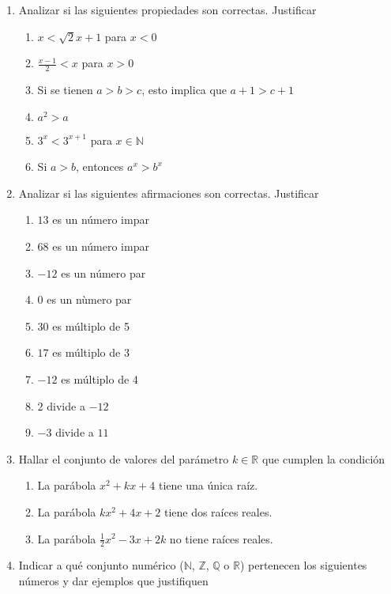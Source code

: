 \documentclass[a4paper]{article}
\newcommand{\exercise}{\item}
\begin{document}
\begin{enumerate}
	\exercise Analizar si las siguientes propiedades son correctas. Justificar
	\begin{multicols}{2}
	\begin{enumerate} [label=(\alph*)]
		\item $x < \sqrt{2} x +1$ para $x<0$
		\item $\displaystyle\frac{x-1}{2} < x$ para $x>0$
		\item Si se tienen $a>b>c$, esto implica que $a+1>c+1$
		\item $a^2 > a$
		\item $3^{x} < 3^{x+1}$ para $x \in \mathbb{N}$
		\item Si $a>b$, entonces $a^x > b^x$
	\end{enumerate}
	\end{multicols}
	\exercise Analizar si las siguientes afirmaciones son correctas. Justificar
	\begin{multicols}{2}
	\begin{enumerate} [label=(\alph*)]
		\item $13$ es un número impar
		\item $68$ es un número impar
		\item $-12$ es un número par
		\item $0$ es un nùmero par
		\item $30$ es múltiplo de 5
		\item $17$ es múltiplo de 3
		\item $-12$ es múltiplo de 4
		\item $2$ divide a $-12$
		\item $-3$ divide a $11$
	\end{enumerate}
	\end{multicols}
	\exercise Hallar el conjunto de valores del parámetro $k \in \mathbb{R}$ que cumplen la condición
	\begin{enumerate} [label=(\alph*)]
		\item La parábola $x^2+kx+4$ tiene una única raíz.
		\item La parábola $kx^2+4x+2$ tiene dos raíces reales.
		\item La parábola $\displaystyle\frac{1}{2}x^2-3x+2k$ no tiene raíces reales.
	\end{enumerate}
	\exercise Indicar a qué conjunto numérico ($\mathbb{N}$, $\mathbb{Z}$, $\mathbb{Q}$ o $\mathbb{R}$) pertenecen los siguientes números y dar ejemplos que justifiquen

\end{enumerate}
\end{document}
